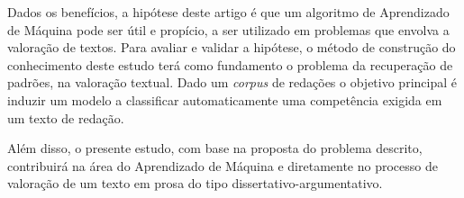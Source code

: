 Dados os benefícios, a hipótese deste artigo é que um algoritmo de Aprendizado 
de Máquina pode ser útil e propício, a ser utilizado em problemas que envolva a 
valoração de textos. Para avaliar e validar a hipótese, o método de construção 
do conhecimento deste estudo terá como fundamento o problema da recuperação 
de padrões, na valoração textual. Dado um \textit{corpus} de redações o objetivo 
principal é induzir um modelo a classificar automaticamente uma competência 
exigida em um texto de redação. 

Além disso, o presente estudo, com base na proposta do problema descrito, 
contribuirá na área do Aprendizado de Máquina e diretamente no processo de 
valoração de um texto em prosa do tipo dissertativo-argumentativo.
